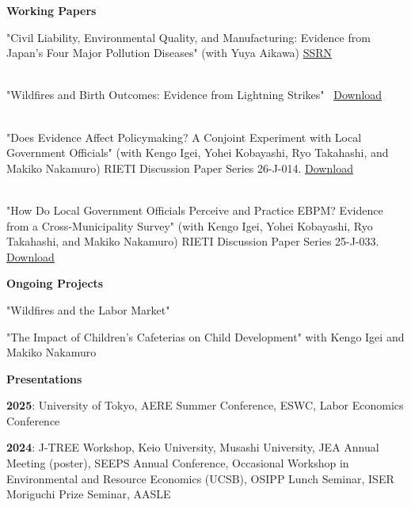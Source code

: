 \documentclass{article}
\begin{document}
\hrulefill

\begin{flushleft}
  \textbf{\large{Working Papers}}
\end{flushleft}

"Civil Liability, Environmental Quality, and Manufacturing: Evidence from Japan's Four Major Pollution Diseases" (with Yuya Aikawa) \href{https://papers.ssrn.com/sol3/papers.cfm?abstract_id=7539260}{SSRN}

\ \\

"Wildfires and Birth Outcomes: Evidence from Lightning Strikes" \ \href{https://dx.doi.org/10.2139/ssrn.4833440}{Download}

\ \\

"Does Evidence Affect Policymaking? A Conjoint Experiment with Local Government Officials" (with Kengo Igei, Yohei Kobayashi, Ryo Takahashi, and Makiko Nakamuro) RIETI Discussion Paper Series 26-J-014. \href{https://www.rieti.go.jp/jp/publications/dp/26j014.pdf}{Download}

\ \\

"How Do Local Government Officials Perceive and Practice EBPM? Evidence from a Cross-Municipality Survey" (with Kengo Igei, Yohei Kobayashi, Ryo Takahashi, and Makiko Nakamuro) RIETI Discussion Paper Series 25-J-033. \href{https://www.rieti.go.jp/jp/publications/dp/25j033.pdf}{Download}

\hrulefill

\begin{flushleft}
  \textbf{\large{Ongoing Projects}}
\end{flushleft}

"Wildfires and the Labor Market"

"The Impact of Children's Cafeterias on Child Development" with Kengo Igei and Makiko Nakamuro

\hrulefill

\newpage

\begin{flushleft}
  \textbf{\large{Presentations}}
\end{flushleft}

\textbf{2025}: University of Tokyo, AERE Summer Conference, ESWC, Labor Economics Conference

\textbf{2024}: J-TREE Workshop, Keio University, Musashi University, JEA Annual Meeting (poster), SEEPS Annual Conference, Occasional Workshop in Environmental and Resource Economics (UCSB), OSIPP Lunch Seminar, ISER Moriguchi Prize Seminar, AASLE
\end{document}
